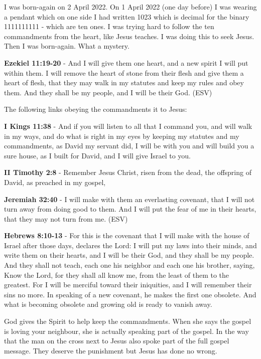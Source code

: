 \documentclass[11pt]{article}
\begin{document}
I was born-again on 2 April 2022. On 1 April 2022 (one day before) I was wearing a pendant which on one side I had written 1023 which is decimal for the binary 1111111111 - which are ten ones. I was trying hard to follow the ten commandments from the heart, like Jesus teaches. I was doing this to seek Jesus. Then I was born-again. What a mystery.

\textbf{Ezekiel 11:19-20} - And I will give them one heart, and a new spirit I will put within them. I will remove the heart of stone from their flesh and give them a heart of flesh, that they may walk in my statutes and keep my rules and obey them. And they shall be my people, and I will be their God. (ESV)

The following links obeying the commandments it to Jesus:

\textbf{I Kings 11:38} - And if you will listen to all that I command you, and will walk in my ways, and do what is right in my eyes by keeping my statutes and my commandments, as David my servant did, I will be with you and will build you a sure house, as I built for David, and I will give Israel to you.

\textbf{II Timothy 2:8} - Remember Jesus Christ, risen from the dead, the offspring of David, as preached in my gospel,

\textbf{Jeremiah 32:40} - I will make with them an everlasting covenant, that I will not turn away from doing good to them. And I will put the fear of me in their hearts, that they may not turn from me. (ESV)

\textbf{Hebrews 8:10-13} - For this is the covenant that I will make with the house of Israel after those days, declares the Lord: I will put my laws into their minds, and write them on their hearts, and I will be their God, and they shall be my people. And they shall not teach, each one his neighbor and each one his brother, saying, Know the Lord, for they shall all know me, from the least of them to the greatest. For I will be merciful toward their iniquities, and I will remember their sins no more. In speaking of a new covenant, he makes the first one obsolete. And what is becoming obsolete and growing old is ready to vanish away.

God gives the Spirit to help keep the commandments. When she says the gospel is loving your neighbour, she is actually speaking part of the gospel. In the way that the man on the cross next to Jesus also spoke part of the full gospel message. They deserve the punishment but Jesus has done no wrong.
\end{document}
